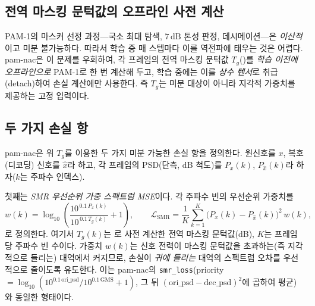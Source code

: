 \documentclass[11pt,a4paper]{article}
\newcommand{\dB}{\ensuremath{\,\mathrm{dB}}}          %
\begin{document}
\subsection{전역 마스킹 문턱값의 오프라인 사전 계산}
PAM-1의 마스커 선정 과정---국소 최대 탐색, $7\dB$ 톤성 판정, 데시메이션---은
\emph{이산적}이고 미분 불가능하다. 따라서 학습 중 매 스텝마다 이를 역전파에 태우는
것은 어렵다. pam-nac은 이 문제를 우회하여, 각 프레임의 전역 마스킹 문턱값
$T_g$()를 \emph{학습 이전에 오프라인으로} PAM-1로 한 번 계산해 두고,
학습 중에는 이를 \emph{상수 텐서}로 취급(detach)하여 손실 계산에만 사용한다. 즉
$T_g$는 미분 대상이 아니라 지각적 가중치를 제공하는 고정 입력이다.

\subsection{두 가지 손실 항}
pam-nac은 위 $T_g$를 이용한 두 가지 미분 가능한 손실 항을 정의한다. 원신호를
$x$, 복호(디코딩) 신호를 $\hat{x}$라 하고, 각 프레임의 PSD(단측, dB 척도)를
$P_x(k)$, $P_{\hat{x}}(k)$라 하자($k$는 주파수 인덱스).

첫째는 \emph{SMR 우선순위 가중 스펙트럼 MSE}이다. 각 주파수 빈의 우선순위
가중치를
\begin{equation}\label{eq:smrloss}
  w(k) = \log_{10}\!\left(
     \frac{10^{\,0.1\,P_x(k)}}{10^{\,0.1\,T_g(k)}} + 1
  \right),
  \qquad
  \mathcal{L}_{\mathrm{SMR}}
   = \frac{1}{K}\sum_{k=1}^{K}
     \bigl(P_x(k) - P_{\hat{x}}(k)\bigr)^{2}\, w(k),
\end{equation}
로 정의한다. 여기서 $T_g(k)$는 로 사전 계산한 전역 마스킹
문턱값(dB), $K$는 프레임당 주파수 빈 수이다. 가중치 $w(k)$는 신호 전력이 마스킹
문턱값을 초과하는(즉 지각적으로 들리는) 대역에서 커지므로, 손실이 \emph{귀에 들리는}
대역의 스펙트럼 오차를 우선적으로 줄이도록 유도한다. 이는 pam-nac의
\texttt{smr\_loss}(priority $= \log_{10}(10^{0.1\,\mathrm{ori\_psd}} /
10^{0.1\,\mathrm{GMS}} + 1)$, 그 뒤 $(\mathrm{ori\_psd} - \mathrm{dec\_psd})^2$에
곱하여 평균)와 동일한 형태이다.
\end{document}
